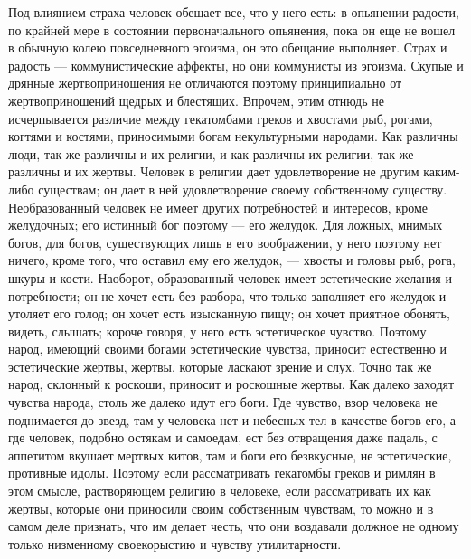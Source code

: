 \documentclass[12pt]{article}
\begin{document}
Под влиянием страха человек обещает все, что у него есть: в опьянении радости, по крайней мере в состоянии первоначального опьянения, пока он еще не вошел в обычную колею повседневного эгоизма, он это обещание выполняет. Страх и радость --- коммунистические аффекты, но они коммунисты из эгоизма. Скупые и дрянные жертвоприношения не отличаются поэтому принципиально от жертвоприношений щедрых и блестящих. Впрочем, этим отнюдь не исчерпывается различие между гекатомбами греков и хвостами рыб, рогами, когтями и костями, приносимыми богам некультурными народами. Как различны люди, так же различны и их религии, и как различны их религии, так же различны и их жертвы. Человек в религии дает удовлетворение не другим каким-либо существам; он дает в ней удовлетворение своему собственному существу. Необразованный человек не имеет других потребностей и интересов, кроме желудочных; его истинный бог поэтому --- его желудок. Для ложных, мнимых богов, для богов, существующих лишь в его воображении, у него поэтому нет ничего, кроме того, что оставил ему его желудок, --- хвосты и головы рыб, рога, шкуры и кости. Наоборот, образованный человек имеет эстетические желания и потребности; он не хочет есть без разбора, что только заполняет его желудок и утоляет его голод; он хочет есть изысканную пищу; он хочет приятное обонять, видеть, слышать; короче говоря, у него есть эстетическое чувство. Поэтому народ, имеющий своими богами эстетические чувства, приносит естественно и эстетические жертвы, жертвы, которые ласкают зрение и слух. Точно так же народ, склонный к роскоши, приносит и роскошные жертвы. Как далеко заходят чувства народа, столь же далеко идут его боги. Где чувство, взор человека не поднимается до звезд, там у человека нет и небесных тел в качестве богов его, а где человек, подобно остякам и самоедам, ест без отвращения даже падаль, с аппетитом вкушает мертвых китов, там и боги его безвкусные, не эстетические, противные идолы. Поэтому если рассматривать гекатомбы греков и римлян в этом смысле, растворяющем религию в человеке, если рассматривать их как жертвы, которые они приносили своим собственным чувствам, то можно и в самом деле признать, что им делает честь, что они воздавали должное не одному только низменному своекорыстию и чувству утилитарности. 
\end{document}
